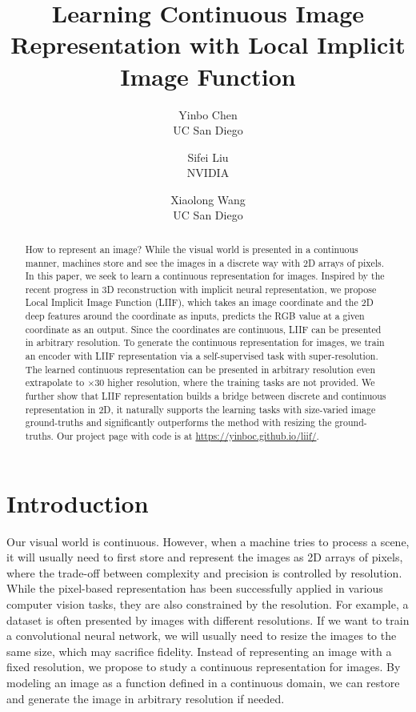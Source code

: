 \documentclass[final]{cvpr}
\begin{document}
\title{Learning Continuous Image Representation with Local Implicit Image Function}

\author{Yinbo Chen\\
UC San Diego
\and
Sifei Liu\\
NVIDIA
\and
Xiaolong Wang\\
UC San Diego
}

\maketitle


\begin{abstract}
How to represent an image? While the visual world is presented in a continuous manner, machines store and see the images in a discrete way with 2D arrays of pixels. In this paper, we seek to learn a continuous representation for images. Inspired by the recent progress in 3D reconstruction with implicit neural representation, we propose Local Implicit Image Function (LIIF), which takes an image coordinate and the 2D deep features around the coordinate as inputs, predicts the RGB value at a given coordinate as an output. Since the coordinates are continuous, LIIF can be presented in arbitrary resolution. To generate the continuous representation for images, we train an encoder with LIIF representation via a self-supervised task with super-resolution. The learned continuous representation can be presented in arbitrary resolution even extrapolate to $\times 30$ higher resolution, where the training tasks are not provided. We further show that LIIF representation builds a bridge between discrete and continuous representation in 2D, it naturally supports the learning tasks with size-varied image ground-truths and significantly outperforms the method with resizing the ground-truths. Our project page with code is at \url{https://yinboc.github.io/liif/}.
\end{abstract}



\section{Introduction}

Our visual world is continuous. However, when a machine tries to process a scene, it will usually need to first store and represent the images as 2D arrays of pixels, where the trade-off between complexity and precision is controlled by resolution. While the pixel-based representation has been successfully applied in various computer vision tasks, they are also constrained by the resolution. For example, a dataset is often presented by images with different resolutions. If we want to train a convolutional neural network, we will usually need to resize the images to the same size, which may sacrifice fidelity. Instead of representing an image with a fixed resolution, we propose to study a continuous representation for images. By modeling an image as a function defined in a continuous domain, we can restore and generate the image in arbitrary resolution if needed. 
\end{document}
